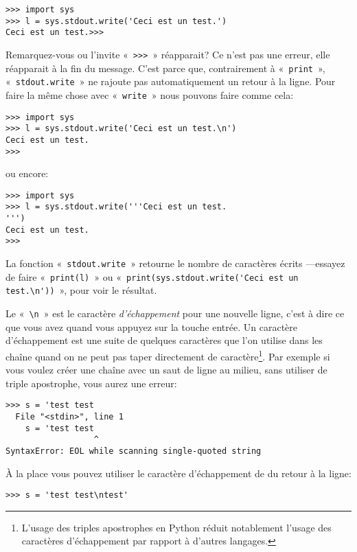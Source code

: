 \begin{Verbatim}[frame=single,rulecolor=\color{gray}]
>>> import sys
>>> l = sys.stdout.write('Ceci est un test.')
Ceci est un test.>>>
\end{Verbatim}

Remarquez-vous ou l'invite «~\texttt{>>>}~» réapparait? Ce n'est pas une erreur, elle réapparait à la fin du message. C'est parce que, contrairement à «~\texttt{print}~», «~\texttt{stdout.write}~» ne rajoute pas automatiquement un retour à la ligne. Pour faire la même chose avec «~\texttt{write}~»  nous pouvons faire comme cela:

\begin{Verbatim}[frame=single,rulecolor=\color{gray}]
>>> import sys
>>> l = sys.stdout.write('Ceci est un test.\n')
Ceci est un test.
>>>
\end{Verbatim}
ou encore: 
\begin{Verbatim}[frame=single,rulecolor=\color{gray}]
>>> import sys
>>> l = sys.stdout.write('''Ceci est un test.
''')
Ceci est un test.
>>>
\end{Verbatim}

La fonction «~\texttt{stdout.write}~» retourne le nombre de caractères écrits ---essayez de faire «~\texttt{print(l)}~» ou «~\verb+print(sys.stdout.write('Ceci est un test.\n'))+~», pour voir le résultat.

Le «~\texttt{{\textbackslash}n}~» est le caractère \emph{d'échappement} pour une nouvelle ligne, c'est à dire ce que vous avez quand vous appuyez sur la touche entrée. Un caractère d'échappement est une suite de quelques caractères que l'on utilise dans les chaîne quand on ne peut pas taper directement de caractère\footnote{L'usage des triples apostrophes en Python réduit notablement l'usage des caractères d'échappement par rapport à d'autres langages.}. Par exemple si vous voulez créer une chaîne avec un saut de ligne au milieu, sans utiliser de triple apostrophe, vous aurez une erreur:
\begin{Verbatim}[frame=single,rulecolor=\color{red},label=ne fonctionne pas]
>>> s = 'test test 
  File "<stdin>", line 1
    s = 'test test 
                  ^
SyntaxError: EOL while scanning single-quoted string
\end{Verbatim}

À la place vous pouvez utiliser le caractère d'échappement de du retour à la ligne:

\begin{Verbatim}[frame=single,rulecolor=\color{gray}]
>>> s = 'test test\ntest'
\end{Verbatim}

